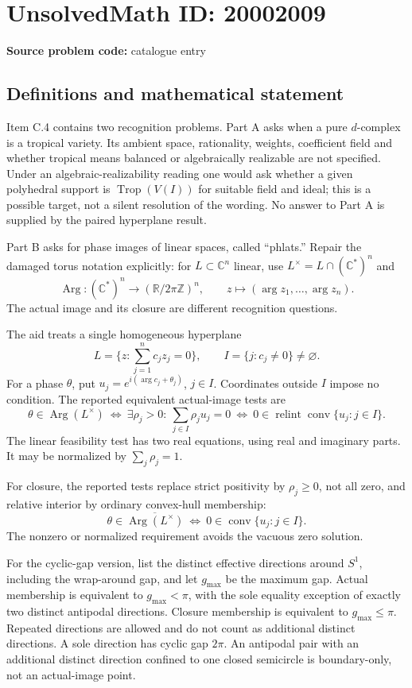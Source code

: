 \documentclass[11pt]{article}
\begin{document}
\section*{UnsolvedMath ID: 20002009}
\textbf{Source problem code:} catalogue entry
\subsection{Definitions and mathematical statement}
Item C.4 contains two recognition problems. Part A asks when a pure \(d\)-complex is a tropical variety. Its ambient space, rationality, weights, coefficient field and whether tropical means balanced or algebraically realizable are not specified. Under an algebraic-realizability reading one would ask whether a given polyhedral support is \(\operatorname{Trop}(V(I))\) for suitable field and ideal; this is a possible target, not a silent resolution of the wording. No answer to Part A is supplied by the paired hyperplane result.

Part B asks for phase images of linear spaces, called ``phlats.'' Repair the damaged torus notation explicitly: for \(L\subset\mathbb C^n\) linear, use \(L^\times=L\cap(\mathbb C^*)^n\) and
\[
 \operatorname{Arg}:(\mathbb C^*)^n\to
 (\mathbb R/2\pi\mathbb Z)^n,\qquad
 z\longmapsto(\arg z_1,\ldots,\arg z_n).
\]
The actual image and its closure are different recognition questions.

The aid treats a single homogeneous hyperplane
\[
 L=\{z:\sum_{j=1}^n c_jz_j=0\},\qquad
 I=\{j:c_j\ne0\}\ne\varnothing.
\]
For a phase \(\theta\), put \(u_j=e^{i(\arg c_j+\theta_j)}\), \(j\in I\). Coordinates outside \(I\) impose no condition. The reported equivalent actual-image tests are
\[
 \theta\in\operatorname{Arg}(L^\times)
 \ \Longleftrightarrow\
 \exists\rho_j>0:\ \sum_{j\in I}\rho_ju_j=0
 \ \Longleftrightarrow\
 0\in\operatorname{relint}\operatorname{conv}\{u_j:j\in I\}.
\]
The linear feasibility test has two real equations, using real and imaginary parts. It may be normalized by \(\sum_j\rho_j=1\).

For closure, the reported tests replace strict positivity by \(\rho_j\geq0\), not all zero, and relative interior by ordinary convex-hull membership:
\[
 \theta\in\overline{\operatorname{Arg}(L^\times)}
 \ \Longleftrightarrow\
 0\in\operatorname{conv}\{u_j:j\in I\}.
\]
The nonzero or normalized requirement avoids the vacuous zero solution.

For the cyclic-gap version, list the distinct effective directions around \(S^1\), including the wrap-around gap, and let \(g_{\max}\) be the maximum gap. Actual membership is equivalent to \(g_{\max}<\pi\), with the sole equality exception of exactly two distinct antipodal directions. Closure membership is equivalent to \(g_{\max}\leq\pi\). Repeated directions are allowed and do not count as additional distinct directions. A sole direction has cyclic gap \(2\pi\). An antipodal pair with an additional distinct direction confined to one closed semicircle is boundary-only, not an actual-image point.
\end{document}
